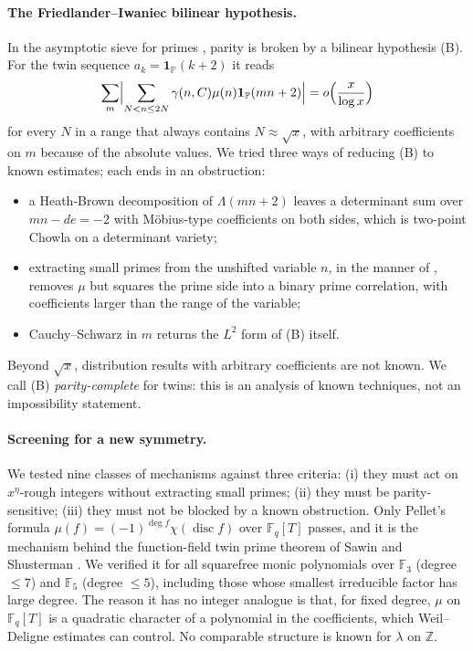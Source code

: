 

\paragraph{The Friedlander--Iwaniec bilinear hypothesis.} In the asymptotic sieve for primes \cite{FI98}, parity is broken by a bilinear hypothesis (B). For the twin sequence $a_k=\mathbf 1_{\mathbb P}(k+2)$ it reads
\[
\sum_m\Bigl|\sum_{N<n\le2N}\gamma(n,C)\mu(n)\mathbf 1_{\mathbb P}(mn+2)\Bigr|=o\Bigl(\frac{x}{\log x}\Bigr)
\]
for every $N$ in a range that always contains $N\approx\sqrt x$, with arbitrary coefficients on $m$ because of the absolute values. We tried three ways of reducing (B) to known estimates; each ends in an obstruction:
\begin{itemize}
\item a Heath-Brown decomposition of $\Lambda(mn+2)$ leaves a determinant sum over $mn-de=-2$ with Möbius-type coefficients on both sides, which is two-point Chowla on a determinant variety;
\item extracting small primes from the unshifted variable $n$, in the manner of \cite{LWW26}, removes $\mu$ but squares the prime side into a binary prime correlation, with coefficients larger than the range of the variable;
\item Cauchy--Schwarz in $m$ returns the $L^2$ form of (B) itself.
\end{itemize}
Beyond $\sqrt x$, distribution results with arbitrary coefficients are not known. We call (B) \emph{parity-complete} for twins: this is an analysis of known techniques, not an impossibility statement.

\paragraph{Screening for a new symmetry.} We tested nine classes of mechanisms against three criteria: (i) they must act on $x^\eta$-rough integers without extracting small primes; (ii) they must be parity-sensitive; (iii) they must not be blocked by a known obstruction. Only Pellet's formula $\mu(f)=(-1)^{\deg f}\chi(\operatorname{disc}f)$ over $\mathbb F_q[T]$ passes, and it is the mechanism behind the function-field twin prime theorem of Sawin and Shusterman \cite{SS22}. We verified it for all squarefree monic polynomials over $\mathbb F_3$ (degree $\le7$) and $\mathbb F_5$ (degree $\le5$), including those whose smallest irreducible factor has large degree. The reason it has no integer analogue is that, for fixed degree, $\mu$ on $\mathbb F_q[T]$ is a quadratic character of a polynomial in the coefficients, which Weil--Deligne estimates can control. No comparable structure is known for $\lambda$ on $\mathbb Z$.

